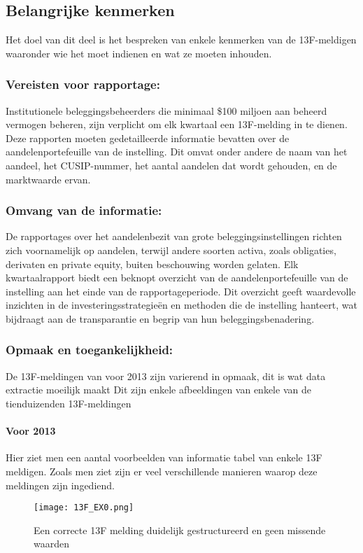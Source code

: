 \subsection{Belangrijke kenmerken}
Het doel van dit deel is het bespreken van enkele kenmerken van de 13F-meldigen waaronder wie het moet indienen en wat ze moeten inhouden.


\subsubsection{Vereisten voor rapportage:}

Institutionele beleggingsbeheerders die minimaal \$100 miljoen aan beheerd vermogen beheren, zijn verplicht om elk kwartaal een 13F-melding in te dienen. Deze rapporten moeten gedetailleerde informatie bevatten over de aandelenportefeuille van de instelling. Dit omvat onder andere de naam van het aandeel, het CUSIP-nummer, het aantal aandelen dat wordt gehouden, en de marktwaarde ervan. 

\subsubsection{Omvang van de informatie:}

De rapportages over het aandelenbezit van grote beleggingsinstellingen richten zich voornamelijk op aandelen, terwijl andere soorten activa, zoals obligaties, derivaten en private equity, buiten beschouwing worden gelaten. Elk kwartaalrapport biedt een beknopt overzicht van de aandelenportefeuille van de instelling aan het einde van de rapportageperiode. Dit overzicht geeft waardevolle inzichten in de investeringsstrategieën en methoden die de instelling hanteert, wat bijdraagt aan de transparantie en begrip van hun beleggingsbenadering.


\subsubsection{Opmaak en toegankelijkheid:}
De 13F-meldingen van voor 2013 zijn varierend in opmaak, dit is wat data extractie moeilijk maakt
Dit zijn enkele afbeeldingen van enkele van de tienduizenden 13F-meldingen

\paragraph{Voor 2013}
Hier ziet men een aantal voorbeelden van informatie tabel van enkele 13F meldigen. Zoals men ziet zijn er veel verschillende manieren waarop deze meldingen zijn ingediend.
\begin{figure}[hbt!]
     \texttt{[image: 13F\_EX0.png]}
     \caption[13F voorbeeld 1]{\label{fig:voorbeeld 1}Een correcte 13F melding duidelijk gestructureerd en geen missende waarden}
\end{figure}



